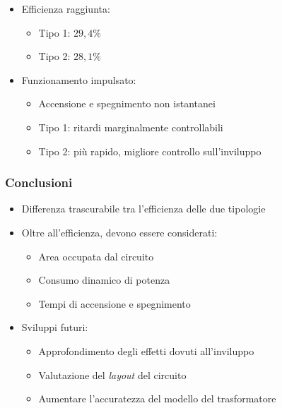\documentclass{beamer}
\begin{document}
\begin{frame}
\begin{itemize}
	\vfill
	\item Efficienza raggiunta:
	\begin{itemize}
		\item Tipo 1: $29,4\%$
		\item Tipo 2: $28,1\%$
	\end{itemize}
	\vfill
	\item Funzionamento impulsato:
	\begin{itemize}
		\item Accensione e spegnimento non istantanei 
		\item Tipo 1: ritardi marginalmente controllabili
		\item Tipo 2: più rapido, migliore controllo sull'inviluppo
	\end{itemize}
	\vfill
\end{itemize}
\end{frame}
%
\begin{frame}
\frametitle{Conclusioni}
\begin{itemize}
	\vfill
      \item Differenza trascurabile tra l'efficienza delle due tipologie
      \vfill
      \item Oltre all'efficienza, devono essere considerati:
	\begin{itemize}
            \item Area occupata dal circuito
            \item Consumo dinamico di potenza
      	\item Tempi di accensione e spegnimento
      \end{itemize}
      \vfill
	\item Sviluppi futuri:
	\begin{itemize}
		\item Approfondimento degli effetti dovuti all'inviluppo
		\item Valutazione del \emph{layout} del circuito
		\item Aumentare l'accuratezza del modello del trasformatore
	\end{itemize}
	\vfill
\end{itemize}
\end{frame}
\end{document}
